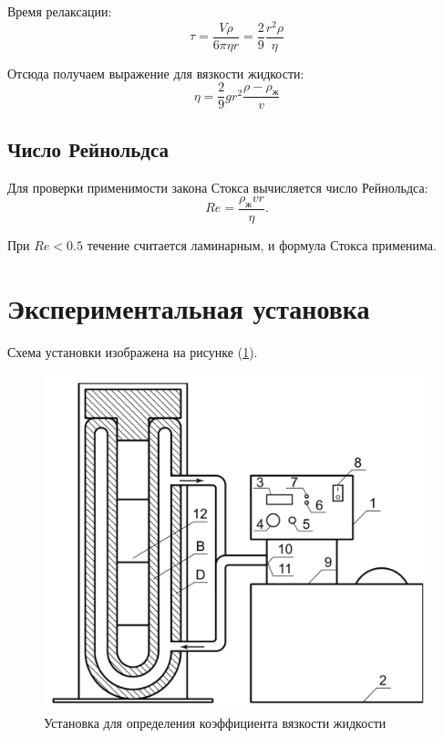 \documentclass[a4paper,12pt]{article} %
\begin{document}
Время релаксации:
\begin{equation}
	\tau = \frac{V \rho}{6 \pi \eta r} = \frac{2}{9} \frac{r^2 \rho}{\eta}
	\label{tau}
\end{equation}

Отсюда получаем выражение для вязкости жидкости:
\begin{equation}
    \eta = \frac{2}{9} g r^2 \frac{\rho - \rho_\text{ж}}{v}
		\label{eta}
\end{equation}
 
\subsection*{Число Рейнольдса}
Для проверки применимости закона Стокса вычисляется число Рейнольдса:
\begin{equation}
    Re = \frac{\rho_\text{ж} v r}{\eta}.
\end{equation}

При $Re < 0.5$ течение считается ламинарным, и формула Стокса применима.

\section*{Экспериментальная установка}

Схема установки изображена на рисунке (\ref{fig:setup}). 

\begin{figure}[h!]
	\centering
	\includegraphics[scale = 0.3]{setup.png}
	\caption{Установка для определения коэффициента вязкости жидкости}
	\label{fig:setup}
\end{figure}
\end{document}

